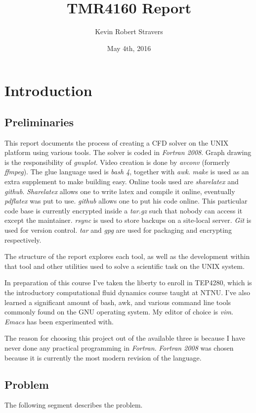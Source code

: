 \documentclass[listof=totoc]{report}
\title{TMR4160 Report}
\author{Kevin Robert Stravers}
\date{May 4th, 2016}
\begin{document}
\maketitle

\tableofcontents
\lstlistoflistings

\chapter{Introduction}
\section{Preliminaries}
This report documents the process of creating a CFD solver on the UNIX platform using various tools. The solver is coded in \emph{Fortran 2008}. Graph drawing is the responsibility of \emph{gnuplot}. Video creation is done by \emph{avconv} (formerly \emph{ffmpeg}). The glue language used is \emph{bash 4}, together with \emph{awk}. \emph{make} is used as an extra supplement to make building easy. Online tools used are \emph{sharelatex} and \emph{github}. \emph{Sharelatex} allows one to write latex and compile it online, eventually \emph{pdflatex} was put to use. \emph{github} allows one to put his code online. This particular code base is currently encrypted inside a \emph{tar.gz} such that nobody can access it except the maintainer. \emph{rsync} is used to store backups on a site-local server. \emph{Git} is used for version control. \emph{tar} and \emph{gpg} are used for packaging and encrypting respectively.

The structure of the report explores each tool, as well as the development within that tool and other utilities used to solve a scientific task on the UNIX system.

In preparation of this course I've taken the liberty to enroll in TEP4280, which is the introductory computational fluid dynamics course taught at NTNU. I've also learned a significant amount of bash, awk, and various command line tools commonly found on the GNU operating system. My editor of choice is \emph{vim}. \emph{Emacs} has been experimented with.

The reason for choosing this project out of the available three is because I have never done any practical programming in \emph{Fortran}. \emph{Fortran 2008} was chosen because it is currently the most modern revision of the language.

\section{Problem}
The following segment describes the problem.
\end{document}
